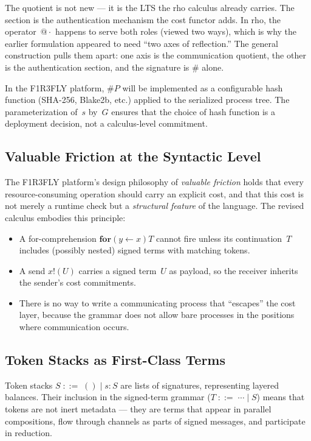 \documentclass[11pt,a4paper]{article}
\makeatletter
\newcommand{\forc}{\mathbf{for}}
\newcommand{\send}[2]{#1 !\!\left( #2 \right)}
\newcommand{\recv}[3]{\forc\!\left( #1 \leftarrow #2 \right) #3}
\newcommand{\quot}[1]{@#1}
\newcommand{\hashf}{\texttt{\#}}
\makeatother
\begin{document}
The quotient is not new --- it is the LTS the rho calculus
already carries.  The section is the authentication mechanism
the cost functor adds.  In rho, the operator~$\quot{\cdot}$
happens to serve both roles (viewed two ways), which is why the
earlier formulation appeared to need ``two axes of
reflection.''  The general construction pulls them apart: one
axis is the communication quotient, the other is the
authentication section, and the signature is $\hashf$ alone.

In the F1R3FLY platform, $\hashf P$ will be implemented as a
configurable hash function (SHA-256, Blake2b, etc.) applied to
the serialized process tree.  The parameterization of~$s$ by~$G$
ensures that the choice of hash function is a deployment
decision, not a calculus-level commitment.

\subsection{Valuable Friction at the Syntactic Level}
\label{sec:valuable-friction}

The F1R3FLY platform's design philosophy of \emph{valuable
friction} holds that every resource-consuming operation should
carry an explicit cost, and that this cost is not merely a
runtime check but a \emph{structural feature} of the language.
The revised calculus embodies this principle:

\begin{itemize}[nosep]
  \item A for-comprehension $\recv{y}{x}{T}$ cannot fire unless
    its continuation~$T$ includes (possibly nested) signed
    terms with matching tokens.
  \item A send $\send{x}{U}$ carries a signed term~$U$ as
    payload, so the receiver inherits the sender's cost
    commitments.
  \item There is no way to write a communicating process that
    ``escapes'' the cost layer, because the grammar does not
    allow bare processes in the positions where communication
    occurs.
\end{itemize}

\subsection{Token Stacks as First-Class Terms}
\label{sec:token-stacks}

Token stacks $S \;::=\; () \mid s : S$ are lists of signatures,
representing layered balances.  Their inclusion in the
signed-term grammar ($T \;::=\; \cdots \mid S$) means that
tokens are not inert metadata --- they are terms that appear in
parallel compositions, flow through channels as parts of signed
messages, and participate in reduction.
\end{document}
